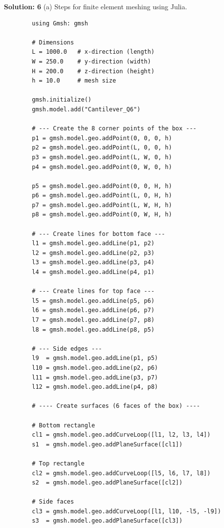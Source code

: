 \documentclass{homework}
\begin{document}
\begin{solution}
    \textbf{Solution: 6}
    (a) Steps for finite element meshing using Julia. 
    \sloppy
    \begin{verbatim}
        using Gmsh: gmsh

        # Dimensions
        L = 1000.0   # x-direction (length)
        W = 250.0    # y-direction (width)
        H = 200.0    # z-direction (height)
        h = 10.0     # mesh size
        
        gmsh.initialize()
        gmsh.model.add("Cantilever_Q6")
        
        # --- Create the 8 corner points of the box ---
        p1 = gmsh.model.geo.addPoint(0, 0, 0, h)
        p2 = gmsh.model.geo.addPoint(L, 0, 0, h)
        p3 = gmsh.model.geo.addPoint(L, W, 0, h)
        p4 = gmsh.model.geo.addPoint(0, W, 0, h)
        
        p5 = gmsh.model.geo.addPoint(0, 0, H, h)
        p6 = gmsh.model.geo.addPoint(L, 0, H, h)
        p7 = gmsh.model.geo.addPoint(L, W, H, h)
        p8 = gmsh.model.geo.addPoint(0, W, H, h)
        
        # --- Create lines for bottom face ---
        l1 = gmsh.model.geo.addLine(p1, p2)
        l2 = gmsh.model.geo.addLine(p2, p3)
        l3 = gmsh.model.geo.addLine(p3, p4)
        l4 = gmsh.model.geo.addLine(p4, p1)
        
        # --- Create lines for top face ---
        l5 = gmsh.model.geo.addLine(p5, p6)
        l6 = gmsh.model.geo.addLine(p6, p7)
        l7 = gmsh.model.geo.addLine(p7, p8)
        l8 = gmsh.model.geo.addLine(p8, p5)
        
        # --- Side edges ---
        l9  = gmsh.model.geo.addLine(p1, p5)
        l10 = gmsh.model.geo.addLine(p2, p6)
        l11 = gmsh.model.geo.addLine(p3, p7)
        l12 = gmsh.model.geo.addLine(p4, p8)
        
        # ---- Create surfaces (6 faces of the box) ----
        
        # Bottom rectangle
        cl1 = gmsh.model.geo.addCurveLoop([l1, l2, l3, l4])
        s1  = gmsh.model.geo.addPlaneSurface([cl1])
        
        # Top rectangle
        cl2 = gmsh.model.geo.addCurveLoop([l5, l6, l7, l8])
        s2  = gmsh.model.geo.addPlaneSurface([cl2])
        
        # Side faces
        cl3 = gmsh.model.geo.addCurveLoop([l1, l10, -l5, -l9])
        s3  = gmsh.model.geo.addPlaneSurface([cl3])
        

\end{verbatim}
\end{solution}
\end{document}
